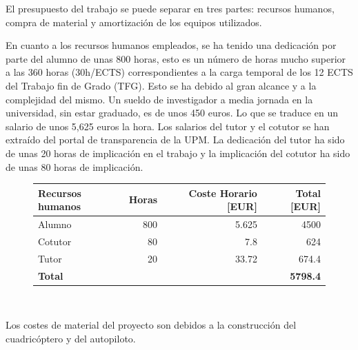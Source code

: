 El presupuesto del trabajo se puede separar en tres partes: recursos humanos, compra de material y amortización de los equipos utilizados.

En cuanto a los recursos humanos empleados, se ha tenido una dedicación por parte del alumno de unas 800 horas, esto es un número de horas mucho superior a las 360 horas (30h/ECTS) correspondientes a la carga temporal de los 12 ECTS del Trabajo fin de Grado (TFG). Esto se ha debido al gran alcance y a la complejidad del mismo. Un sueldo de investigador a media jornada en la universidad, sin estar graduado, es de unos 450 euros. Lo que se traduce en un salario de unos 5,625 euros la hora. Los salarios del tutor y el cotutor se han extraído del portal de transparencia de la UPM. La dedicación del tutor ha sido de unas 20 horas de implicación en el trabajo y la implicación del cotutor ha sido de unas 80 horas de implicación.  

\begin{figure}[htb!]
		\centering
		\begin{tabular}{|l|r|r|r|}
		\hline
		
		\textbf{Recursos humanos} & Horas &Coste Horario [EUR]&Total [EUR]\\
		\hline
		
		Alumno & 800 & 5.625 &  4500 \\
		Cotutor & 80 & 7.8 & 624\\
		Tutor & 20& 33.72 & 674.4 \\
		\hline
		\textbf{Total} & &  & \textbf{5798.4}\\
		\hline
		\end{tabular}\\
	
\end{figure}

Los costes de material del proyecto son debidos a la construcción del cuadricóptero y del autopiloto.


